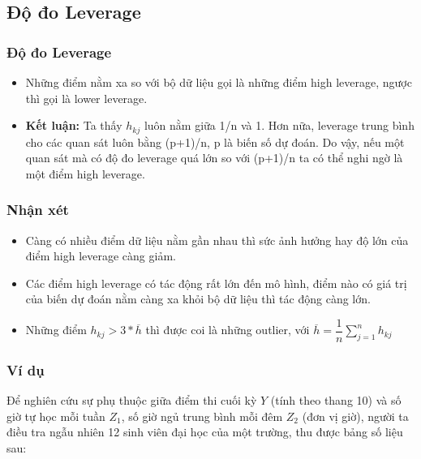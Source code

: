 \begin{footnotesize}
\subsection{Độ đo Leverage}
\begin{frame}
\frametitle{Độ đo Leverage}
	\begin{itemize}
    \begin{block}{Định nghĩa}
    \textbf{Leverage} là độ đo khoảng cách giữa một điểm dữ liệu và phần còn lại của bộ dữ liệu dựa trên miền giá trị của bộ dữ liệu, được xác định bởi công thức:
    $$ h_{k j}=\frac{1}{n}+\frac{\left(z_{kj}-\overline{z}\right)^{2}}{\sum_{j=1}^{n}\left(z_{kj}-\overline{z}\right)^{2}}$$
    \end{block}
    \item Những điểm nằm xa so với bộ dữ liệu gọi là những điểm high leverage, ngược thì gọi là lower leverage.
    \item \textbf{Kết luận:} Ta thấy $h_{kj}$ luôn nằm giữa 1/n và 1. Hơn nữa, leverage trung bình cho các quan sát luôn bằng (p+1)/n, p là biến số dự đoán. Do vậy, nếu một quan sát mà có độ đo leverage quá lớn so với (p+1)/n ta có thể nghi ngờ là một điểm high leverage.
\end{itemize}
\end{frame}
\begin{frame}
\frametitle{Nhận xét}
\begin{itemize}
   \item Càng có nhiều điểm dữ liệu nằm gần nhau thì sức ảnh hưởng hay độ lớn của điểm high leverage càng giảm.
   \item Các điểm high leverage có tác động rất lớn đến mô hình, điểm nào có giá trị của biến dự đoán nằm càng xa khỏi bộ dữ liệu thì tác động càng lớn.
   \item Những điểm $h_{kj} > 3*\overline{h}$ thì được coi là những outlier, với $\overline{h} = \dfrac{1}{n}\sum_{j=1}^n{h_{kj}}$
\end{itemize}
\end{frame}
\begin{frame}
\frametitle{Ví dụ}

Để nghiên cứu sự phụ thuộc giữa điểm thi cuối kỳ $Y$ (tính theo thang 10) và số giờ tự học mỗi tuần $Z_1$, số giờ ngủ trung bình mỗi đêm $Z_2$ (đơn vị giờ), người ta điều tra ngẫu nhiên 12 sinh viên đại học của một trường, thu được bảng số liệu sau:


\end{frame}
\end{footnotesize}
